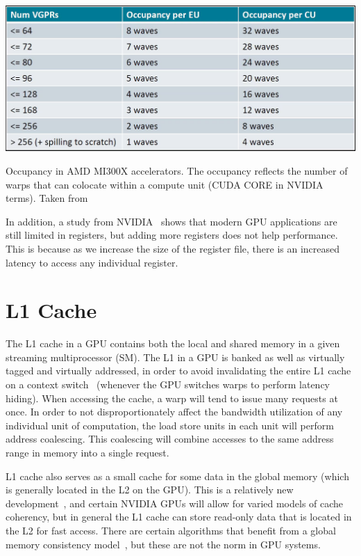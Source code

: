 \begin{table}
  \centering
  \includegraphics[scale=0.3]{assets/amd_occupancy.png}
  \caption{Occupancy in AMD MI300X accelerators. The occupancy reflects the number of warps that can colocate within a compute unit (CUDA CORE in NVIDIA terms). Taken from~\cite{amd:occupancy, amd:register-pressure}}
  \label{tab:amdoccupancy}
\end{table}

In addition, a study from NVIDIA~\cite{nvidia:register-pressure} shows that modern GPU applications are still limited in registers, but adding more registers does not help performance. This is because as we increase the size of the register file, there is an increased latency to access any individual register.

\section{L1 Cache}

The L1 cache in a GPU contains both the local and shared memory in a given streaming multiprocessor (SM). The L1 in a GPU is banked as well as virtually tagged and virtually addressed, in order to avoid invalidating the entire L1 cache on a context switch~\cite{GPGPUbook} (whenever the GPU switches warps to perform latency hiding). When accessing the cache, a warp will tend to issue many requests at once. In order to not disproportionately affect the bandwidth utilization of any individual unit of computation, the load store units in each unit will perform address coalescing. This coalescing will combine accesses to the same address range in memory into a single request.

L1 cache also serves as a small cache for some data in the global memory (which is generally located in the L2 on the GPU). This is a relatively new development~\cite{nvforum:l1-global-caching}, and certain NVIDIA GPUs will allow for varied models of cache coherency, but in general the L1 cache can store read-only data that is located in the L2 for fast access. There are certain algorithms that benefit from a global memory consistency model~\cite{singh:temporal-coherence}, but these are not the norm in GPU systems.

